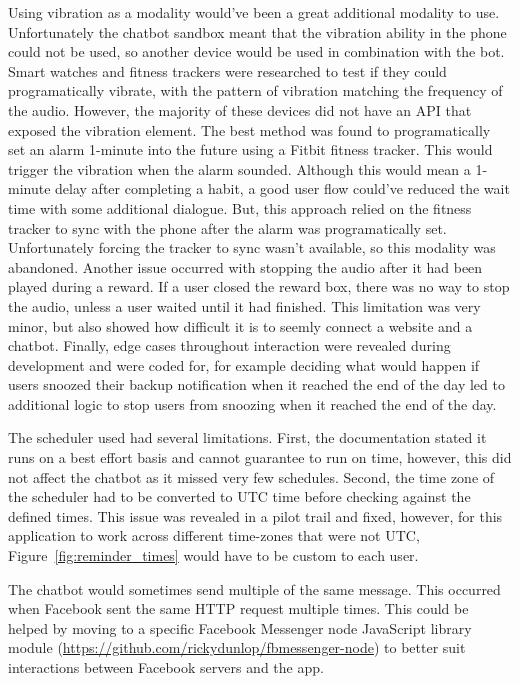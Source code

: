 Using vibration as a modality would've been a great additional modality to use.
Unfortunately the chatbot sandbox meant that the vibration ability in the phone could not be used, so another device would be used in combination with the bot.
Smart watches and fitness trackers were researched to test if they could programatically vibrate, with the pattern of vibration matching the frequency of the audio.
However, the majority of these devices did not have an API that exposed the vibration element. The best method was found to programatically set an alarm 1-minute into the future using a Fitbit fitness tracker.
This would trigger the vibration when the alarm sounded.
Although this would mean a 1-minute delay after completing a habit, a good user flow could've reduced the wait time with some additional dialogue.
But, this approach relied on the fitness tracker to sync with the phone after the alarm was programatically set. Unfortunately forcing the tracker to sync wasn't available, so this modality was abandoned. Another issue occurred with stopping the audio after it had been played during a reward. If a user closed the reward box, there was no way to stop the audio, unless a user waited until it had finished. This limitation was very minor, but also showed how difficult it is to seemly connect a website and a chatbot. Finally, edge cases throughout interaction were revealed during development and were coded for, for example deciding what would happen if users snoozed their backup notification when it reached the end of the day led to additional logic to stop users from snoozing when it reached the end of the day.

The scheduler used had several limitations. First, the documentation stated it runs on a best effort basis and cannot guarantee to run on time, however, this did not affect the chatbot as it missed very few schedules. Second, the time zone of the scheduler had to be converted to UTC time before checking against the defined times. This issue was revealed in a pilot trail and fixed, however, for this application to work across different time-zones that were not UTC, Figure~\ref{fig:reminder_times} would have to be custom to each user.

The chatbot would sometimes send multiple of the same message. This occurred when Facebook sent the same HTTP request multiple times. This could be helped by moving to a specific Facebook Messenger node JavaScript library module (\url{https://github.com/rickydunlop/fbmessenger-node}) to better suit interactions between Facebook servers and the app.

